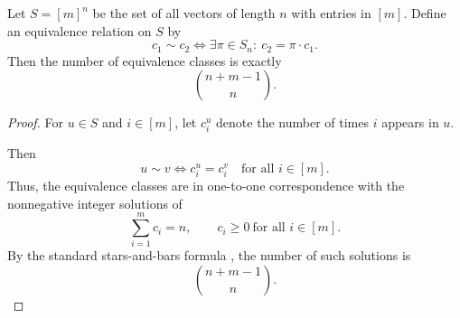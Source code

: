 \documentclass{article}
\begin{document}
\begin{lemma}
\label{comb_proof}
Let $S=[m]^n$ be the set of all vectors of length $n$ with entries in $[m]$.
Define an equivalence relation on $S$ by
\[
c_1\sim c_2
\iff
\exists \pi\in S_n:\ c_2=\pi\cdot c_1.
\]
Then the number of equivalence classes is exactly
\[
\binom{n+m-1}{n}.
\]
\end{lemma}

\begin{proof}
For $u\in S$ and $i\in[m]$, let $c_i^u$ denote the number of times $i$ appears in $u$.

Then
\[
u\sim v
\iff
c_i^u=c_i^v
\quad\text{for all } i\in[m].
\]
Thus, the equivalence classes are in one-to-one correspondence with the nonnegative integer solutions of
\[
\sum_{i=1}^m c_i=n,
\qquad
c_i\geq 0 \ \text{for all } i\in[m].
\]
By the standard stars-and-bars formula \cite{stanley2011enumerative}, the number of such solutions is
\[
\binom{n+m-1}{n}.
\]
\end{proof}
\end{document}

